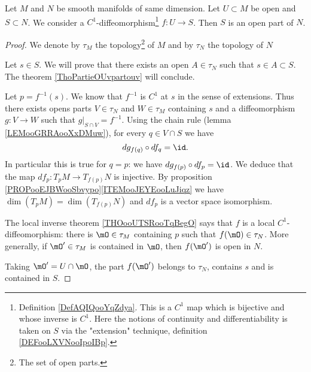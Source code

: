 \begin{theorem}	\label{THOooGUELooSBQhRu}
	Let \( M\) and \( N\) be smooth manifolds of same dimension. Let \( U\subset M\) be open and \( S\subset N\). We consider a \( C^1\)-diffeomorphism\footnote{Definition \ref{DefAQIQooYqZdya}. This is a \( C^1\) map which is bijective and whose inverse is \( C^1\). Here the notions of continuity and differentiability is taken on \( S\) via the "extension" technique, definition \ref{DEFooLXVNooIpoIBp}.} \(f \colon U\to S  \). Then \( S\) is an open part of \( N\).
\end{theorem}

\begin{proof}
	We denote by \( \tau_M\) the topology\footnote{The set of open parts.} of \( M\) and by \( \tau_N\) the topology of $N$

	Let \( s\in S\). We will prove that there exists an open \( A\in \tau_N\) such that \( s\in A\subset S\). The theorem \ref{ThoPartieOUvpartouv} will conclude.

	Let \( p=f^{-1}(s)\). We know that \( f^{-1}\) is \( C^1\) at \( s\) in the sense of extensions. Thus there exists opens parts \( V\in\tau_N\) and \( W\in\tau_M\) containing \( s\) and a diffeomorphism \(g \colon V\to W  \) such that \( g|_{S\cap V}=f^{-1}\). Using the chain rule (lemma \ref{LEMooGRRAooXxDMuw}), for every \( q\in V\cap S\) we have
	\begin{equation}
		dg_{f(q)}\circ df_q=\id.
	\end{equation}
	In particular this is true for \( q=p\): we have \( dg_{f(p)}\circ df_p=\id\). We deduce that the map \(df_p \colon T_pM\to T_{f(p)}N  \) is injective. By proposition \ref{PROPooEJBWooSbvypo}\ref{ITEMooJEYEooLuJiqz} we have \( \dim(T_pM)=\dim(T_{f(p)}N)\) and \( df_p\) is a vector space isomorphism.

	The local inverse theorem \ref{THOooUTSRooTqBegO} says that \( f\) is a local \( C^1\)-diffeomorphism: there is \( \mO\in\tau_M\) containing \( p\) such that \( f(\mO)\in\tau_N\). More generally, if \( \mO'\in \tau_M\) is contained in \( \mO\), then \( f(\mO')\) is open in \( N\).

	Taking \( \mO'=U\cap\mO\), the part \( f(\mO')\) belongs to \( \tau_N\), contains \( s\) and is contained in \( S\).
\end{proof}

